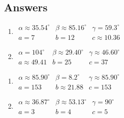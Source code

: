 \documentclass{ximera}
\begin{document}
\newpage

\subsection{Answers}

\begin{multicols}{2}

\begin{enumerate}

\item $\begin{array}{lll}
\alpha \approx 35.54^{\circ} & \beta \approx 85.16^{\circ} & \gamma = 59.3^{\circ} \\
a = 7 & b = 12 & c \approx 10.36 \end{array}$

\item $\begin{array}{lll}
\alpha = 104^{\circ} & \beta \approx 29.40^{\circ} & \gamma \approx 46.60^{\circ} \\
a \approx 49.41 & b = 25 & c = 37 \end{array}$

\setcounter{HW}{\value{enumi}}

\end{enumerate}

\end{multicols}

\begin{multicols}{2} 

\begin{enumerate}

\setcounter{enumi}{\value{HW}}

\item $\begin{array}{lll}
\alpha \approx 85.90^{\circ} & \beta = 8.2^{\circ} & \gamma \approx 85.90^{\circ} \\
a = 153 & b \approx 21.88 & c = 153 \end{array}$

\item $\begin{array}{lll}
\alpha \approx 36.87^{\circ} & \beta \approx 53.13^{\circ} & \gamma = 90^{\circ} \\
a = 3 & b = 4 & c = 5 \end{array}$

\setcounter{HW}{\value{enumi}}

\end{enumerate}

\end{multicols}
\end{document}

